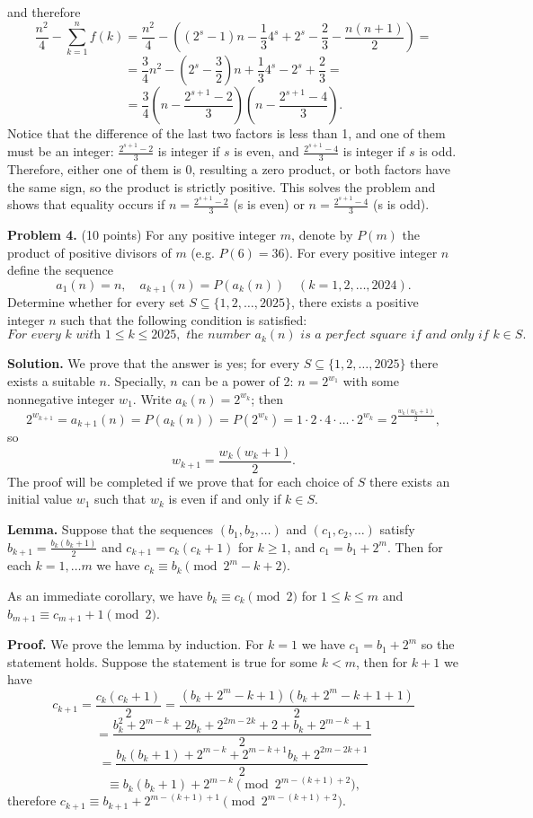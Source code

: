 \documentclass{article}
\begin{document}
and therefore
\[
\frac{n^2}{4} - \sum_{k=1}^n f(k) = \frac{n^2}{4} - \left( (2^s-1)n - \frac{1}{3}4^s + 2^s - \frac{2}{3} - \frac{n(n+1)}{2} \right) =
\]
\[
= \frac{3}{4}n^2 - (2^s - \frac{3}{2})n + \frac{1}{3}4^s - 2^s + \frac{2}{3} =
\]
\[
= \frac{3}{4} \left(n - \frac{2^{s+1} - 2}{3} \right) \left(n - \frac{2^{s+1} - 4}{3} \right).
\]
Notice that the difference of the last two factors is less than 1, and one of them must be an integer: $\frac{2^{s+1} - 2}{3}$ is integer if \( s \) is even, and $\frac{2^{s+1} - 4}{3}$ is integer if \( s \) is odd. Therefore, either one of them is 0, resulting a zero product, or both factors have the same sign, so the product is strictly positive. This solves the problem and shows that equality occurs if \( n = \frac{2^{s+1} - 2}{3} \) (s is even) or \( n = \frac{2^{s+1} - 4}{3} \) (s is odd).

\textbf{Problem 4.} (10 points)
For any positive integer \(m\), denote by \(P(m)\) the product of positive divisors
of \(m\) (e.g. \(P(6) = 36\)).
For every positive integer \(n\) define the sequence
\[
a_1(n) = n, \quad a_{k+1}(n) = P(a_k(n)) \quad (k = 1, 2, \ldots, 2024).
\]
Determine whether for every set \(S \subseteq \{1, 2, \ldots, 2025\}\),
there exists a positive integer \(n\) such that the following condition is satisfied:
\[
\textit{For every } k \textit{ with } 1 \leq k \leq 2025,
\textit{ the number } a_k(n)
\textit{ is a perfect square if and only if } k \in S.
\]

\textbf{Solution.} We prove that the answer is yes;
for every $S \subseteq \{1, 2, \ldots, 2025\}$ there exists a suitable $n$.
Specially, $n$ can be a power of 2: $n = 2^{w_1}$ with some nonnegative integer $w_1$. Write $a_k(n) = 2^{w_k}$; then
\[
2^{w_{k+1}} = a_{k+1}(n) = P(a_k(n)) = P(2^{w_k}) = 1 \cdot 2 \cdot 4 \cdot \ldots \cdot 2^{w_k} = 2^{\frac{w_k(w_k+1)}{2}},
\]
so
\[
w_{k+1} = \frac{w_k(w_k + 1)}{2}.
\]
The proof will be completed if we prove that for each choice of $S$ there exists an initial value $w_1$
such that $w_k$ is even if and only if $k \in S$.

\textbf{Lemma.} Suppose that the sequences $(b_1, b_2, \ldots)$ and $(c_1, c_2, \ldots)$
satisfy $b_{k+1} = \frac{b_k(b_k+1)}{2}$ and $c_{k+1} = c_k(c_k+1)$ for $k \geq 1$, and $c_1 = b_1 + 2^m$.
Then for each $k = 1, \ldots m$ we have $c_k \equiv b_k \pmod{2^m-k+2}$.

As an immediate corollary, we have $b_k \equiv c_k \pmod{2}$ for $1 \leq k \leq m$ and $b_{m+1} \equiv c_{m+1} + 1 \pmod{2}$.

\textbf{Proof.} We prove the lemma by induction.
For $k = 1$ we have $c_1 = b_1 + 2^m$ so the statement holds.
Suppose the statement is true for some $k < m$, then for $k + 1$ we have
\[
c_{k+1} = \frac{c_k (c_k + 1)}{2} = \frac{(b_k + 2^m-k+1)(b_k + 2^m-k+1 + 1)}{2}
\]
\[
= \frac{b_k^2 + 2^{m-k}+2b_k + 2^{2m-2k}+2 + b_k + 2^{m-k}+1}{2}
\]
\[
= \frac{b_k(b_k + 1) + 2^{m-k} + 2^{m-k+1}b_k + 2^{2m-2k+1}}{2}
\]
\[
\equiv b_k(b_k + 1) + 2^{m-k} \pmod{2^{m-(k+1)+2}},
\]
therefore $c_{k+1} \equiv b_{k+1} + 2^{m-(k+1)+1} \pmod{2^{m-(k+1)+2}}$.
\end{document}
